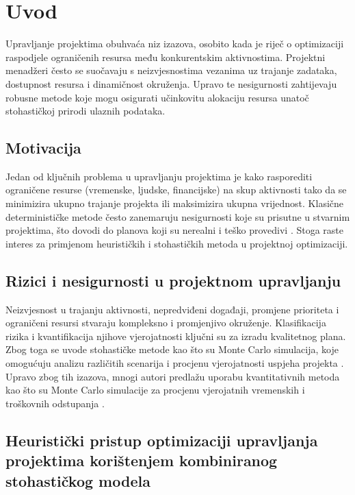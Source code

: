 \section{Uvod}

Upravljanje projektima obuhvaća niz izazova, osobito kada je riječ o optimizaciji raspodjele ograničenih resursa među konkurentskim aktivnostima. Projektni menadžeri često se suočavaju s neizvjesnostima vezanima uz trajanje zadataka, dostupnost resursa i dinamičnost okruženja. Upravo te nesigurnosti zahtijevaju robusne metode koje mogu osigurati učinkovitu alokaciju resursa unatoč stohastičkoj prirodi ulaznih podataka.

\subsection{Motivacija}

Jedan od ključnih problema u upravljanju projektima je kako rasporediti ograničene resurse (vremenske, ljudske, financijske) na skup aktivnosti tako da se minimizira ukupno trajanje projekta ili maksimizira ukupna vrijednost. Klasične determinističke metode često zanemaruju nesigurnosti koje su prisutne u stvarnim projektima, što dovodi do planova koji su nerealni i teško provedivi \cite{Kerzner2017, PMI2021}. Stoga raste interes za primjenom heurističkih i stohastičkih metoda u projektnoj optimizaciji.

\subsection{Rizici i nesigurnosti u projektnom upravljanju}

Neizvjesnost u trajanju aktivnosti, nepredviđeni događaji, promjene prioriteta i ograničeni resursi stvaraju kompleksno i promjenjivo okruženje. Klasifikacija rizika i kvantifikacija njihove vjerojatnosti ključni su za izradu kvalitetnog plana. Zbog toga se uvode stohastičke metode kao što su Monte Carlo simulacija, koje omogućuju analizu različitih scenarija i procjenu vjerojatnosti uspjeha projekta \cite{Vose2008}. Upravo zbog tih izazova, mnogi autori predlažu uporabu kvantitativnih metoda kao što su Monte Carlo simulacije za procjenu vjerojatnih vremenskih i troškovnih odstupanja \cite{Avlijas2008}.

\subsection{Heuristički pristup optimizaciji upravljanja projektima korištenjem kombiniranog stohastičkog modela}

